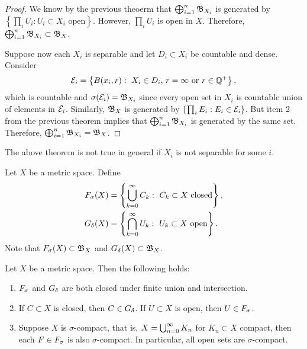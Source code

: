 \documentclass[a4paper]{article}
\begin{document}
\begin{proof}
  We know by the previous theoerm that 
  $\bigoplus_{i=1}^n \mathfrak{B}_{X_i}$ is generated 
  by $\left\{ \prod_i U_i : U_i \subset X_i \text{ open} 
  \right\}$. However, $\prod_i U_i$ is open in $X$. 
  Therefore, $\bigoplus_{i=1}^n \mathfrak{B}_{X_i} \subset \mathfrak{B}_X$.

  Suppose now each $X_i$ is separable and let $D_i \subset X_i$
  be countable and dense. Consider 
  \[
  \mathcal{E}_i = \left\{ B(x_i, r): \text{ $X_i \in D_i$, 
  $r = \infty$ or $r \in \mathbb{Q}^+$} \right\},
  \]
  which is countable and $\sigma(\mathcal{E}_i) = \mathfrak{B}_{X_i}$
  since every open set in $X_i$ is countable union of 
  elements in $\mathcal{E}_i$. Similarly, $\mathfrak{B}_X$ is generated
  by $\left\{ \prod_i E_i : E_i \in \mathcal{E}_i \right\}$. 
  But item 2 from the previous theorem 
  implies that $\bigoplus_{i=1}^n \mathfrak{B}_{X_i}$
  is generated by the same set. Therefore, 
  $\bigoplus_{i=1}^n \mathfrak{B}_{X_i} = \mathfrak{B}_X$.
  
\end{proof}

\begin{remark}
  The above theorem is not true in general 
  if $X_i$ is not separable for some $i$.
\end{remark}

\begin{defi}
  Let $X$ be a metric space. Define 
  \[
  \begin{aligned}
    F_\sigma(X) &= \left\{ \bigcup_{k=0}^\infty C_k : \text{ $C_k \subset X$ 
    closed} \right\}, \\
    G_\delta(X) &= \left\{ \bigcap_{k=0}^\infty U_k : \text{ $U_k \subset X$ 
    open} \right\}.
  \end{aligned}
  \]
  Note that $F_\sigma(X) \subset \mathfrak{B}_X$ and $G_\delta(X) \subset 
  \mathfrak{B}_X$.
\end{defi}

\begin{thm}
  Let $X$ be a metric space. Then the following holds: 
  \begin{enumerate}
    \item $F_\sigma$ and $G_\delta$ are both closed under finite 
    union and intersection.
    \item If $C \subset X$ is closed, then $C \in G_\delta$. 
    If $U \subset X$ is open, then $U \in F_\sigma$.
    \item Suppose $X$ is $\sigma$-compact, that is, 
    $X = \bigcup_{n=0}^\infty K_n$ for $K_n \subset X$ compact, 
    then each $F \in F_\sigma$ is also $\sigma$-compact. 
    In particular, all open sets are $\sigma$-compact.
  \end{enumerate}
\end{thm}
\end{document}
